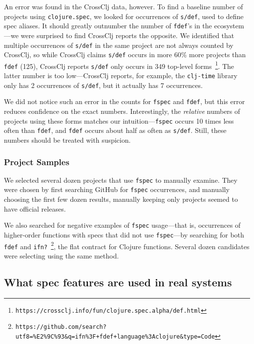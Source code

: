 An error was found in the CrossClj data, however.
To find a baseline number of projects using \texttt{clojure.spec}, we looked for occurrences of
\texttt{s/def}, used to define spec
aliases. It should greatly outnumber the number of \texttt{fdef}'s in the ecosystem---we were
surprised to find CrossClj reports the opposite.
We identified that multiple occurrences of \texttt{s/def} in the same project are not always counted by CrossClj,
so while CrossClj claims \texttt{s/def} occurs in more 60\% more projects than \texttt{fdef} (125), 
CrossClj reports \texttt{s/def} only occurs in 349 top-level 
forms~\footnote{\texttt{https://crossclj.info/fun/clojure.spec.alpha/def.html}}.
The latter number is too low---CrossClj reports, for example, the \texttt{clj-time}
library only has 2 occurrences of \texttt{s/def}, but it actually has 7 occurrences.

We did not notice such an error in the counts for \texttt{fspec} and \texttt{fdef}, but
this error reduces confidence on the exact numbers. Interestingly, the \emph{relative}
numbers of projects using these forms matches our intuition---\texttt{fspec} occurs
10 times less often than \texttt{fdef}, and \texttt{fdef} occurs about half as often as \texttt{s/def}.
Still, these numbers should be treated with suspicion.

\subsubsection{Project Samples}

We selected several dozen projects that use \texttt{fspec} to manually examine.
They were chosen by first searching GitHub for \texttt{fspec} occurrences, and
manually choosing the first few dozen results, manually keeping only projects
seemed to have official releases.

We also searched for negative examples of \texttt{fspec} usage---that is, occurrences
of higher-order functions with specs that did not use \texttt{fspec}---by searching for
both \texttt{fdef} and 
\texttt{ifn?}~\footnote{\texttt{https://github.com/search?utf8=\%E2\%9C\%93\&q=ifn\%3F+fdef+language\%3Aclojure\&type=Code}}, 
the flat contract for Clojure functions.
Several dozen candidates were selecting using the same method.

\subsection{}

\subsection{What spec features are used in real systems}

